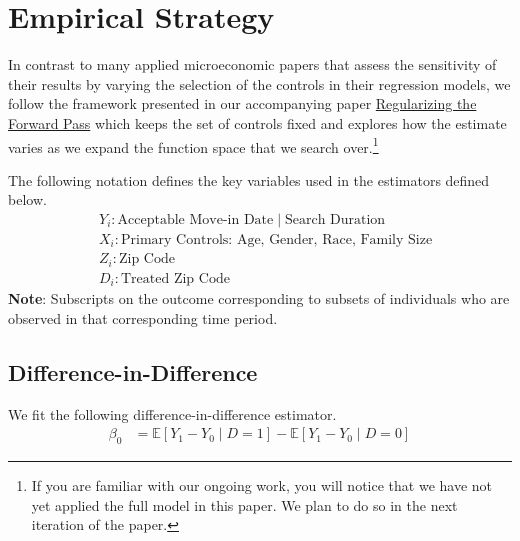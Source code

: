 \documentclass[a4paper,12pt]{article}
\begin{document}
\section{Empirical Strategy}
In contrast to many applied microeconomic papers that assess the sensitivity of their results by varying the selection of the controls in their regression models, we follow the framework presented in our accompanying paper \href{https://github.com/pharringtonp19/rfp_paper/blob/main/Regularizing_the_Forward_Pass.pdf}{Regularizing the Forward Pass} which keeps the set of controls fixed and explores how the estimate varies as we expand the function space that we search over.\footnote{If you are familiar with our ongoing work, you will notice that we have not yet applied the full model in this paper. We plan to do so in the next iteration of the paper.}\par 


The following notation defines the key variables used in the estimators defined below. 
\begin{align*}
    &Y_i: \textrm{Acceptable Move-in Date} \mid \textrm{Search Duration}\\
    &X_i: \textrm{Primary Controls: Age, Gender, Race, Family Size}\\ 
    &Z_i: \textrm{Zip Code} \\
    &D_i: \textrm{Treated Zip Code}
\end{align*}
\textbf{Note}: Subscripts on the outcome corresponding to subsets of individuals who are observed in that corresponding time period. 

\subsection{Difference-in-Difference}
We fit the following difference-in-difference estimator. 
\begin{align*}
    \beta_0 &= \mathbb{E}[Y_1 -Y_0 \mid D=1] -  \mathbb{E}[Y_1 - Y_0 \mid D=0] \end{align*}
    
\end{document}
